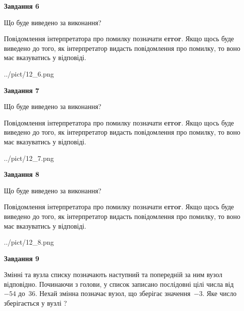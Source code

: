 \documentclass[12pt, ukrainian]{article}
\begin{document}
{\begin {large}
{\begin {center}\textbf{Завдання 6}\end {center}}\par
Що буде виведено за виконання?

Повідомлення інтерпретатора про помилку позначати \textbf{error}.
Якщо щось буде виведено до того, як інтерпретатор видасть повідомлення про помилку, 
то воно має вказуватись у відповіді. \par


\begin{center}
	{../pict/12_6.png}
\end{center}
\newpage

{\begin {center}\textbf{Завдання 7}\end {center}}\par
Що буде виведено за виконання?

Повідомлення інтерпретатора про помилку позначати \textbf{error}.
Якщо щось буде виведено до того, як інтерпретатор видасть повідомлення про помилку, 
то воно має вказуватись у відповіді. \par


\begin{center}
	{../pict/12_7.png}
\end{center}
\newpage

{\begin {center}\textbf{Завдання 8}\end {center}}\par
Що буде виведено за виконання?

Повідомлення інтерпретатора про помилку позначати \textbf{error}.
Якщо щось буде виведено до того, як інтерпретатор видасть повідомлення про помилку, 
то воно має вказуватись у відповіді. \par


\begin{center}
	{../pict/12_8.png}
\end{center}
\newpage

{\begin {center}\textbf{Завдання 9}\end {center}}\par
Змінні  та  вузла списку позначають наступний та попередній за ним вузол відповідно. Починаючи з голови, у список записано послідовні цілі числа від~$-54$ до~$36$. Нехай змінна  позначає вузол, що зберігає значення~$-3$.
Яке число зберігається у вузлі  ?\par
\newpage


\end{large}}
\end{document}
